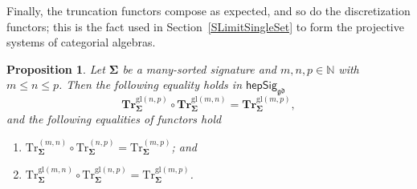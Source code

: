\documentclass[a4paper, reqno
]{amsart}
\newcommand{\sig}[1]{\mathbf{#1}}             %
\newcommand{\gd}{\mathfrak{gd}}              %
\newcommand{\gl}{\mathrm{gl}}                %
\newcommand{\Tr}{\mathrm{Tr}}
\newcommand{\bTr}{\mathbf{Tr}}
\theoremstyle{plain}
\newtheorem{proposition}[theorem]{Proposition}
\theoremstyle{definition}
\begin{document}
Finally, the truncation functors compose as expected, and so do the discretization functors; this is the fact used in Section~\ref{SLimitSingleSet} to form the projective systems of categorial algebras.

\begin{proposition}\label{PTruncComp}
Let $\sig{\Sigma}$ be a many-sorted signature and $m,n,p\in\mathbb{N}$ with $m\leq n\leq p$.
Then the following equality holds in $\mathsf{hepSig}_{\gd}$
$$
\bTr^{\gl(n,p)}_{\sig{\Sigma}}\circ\bTr^{\gl(m,n)}_{\sig{\Sigma}}=\bTr^{\gl(m,p)}_{\sig{\Sigma}},
$$
and the following equalities of functors hold
\begin{enumerate}
	\item
	$\Tr^{(m,n)}_{\sig{\Sigma}}\circ \Tr^{(n,p)}_{\sig{\Sigma}}=\Tr^{(m,p)}_{\sig{\Sigma}}$; and

	\item
	$\Tr^{\gl(m,n)}_{\sig{\Sigma}}\circ \Tr^{\gl(n,p)}_{\sig{\Sigma}}=\Tr^{\gl(m,p)}_{\sig{\Sigma}}$.
\end{enumerate}
\end{proposition}
\end{document}
